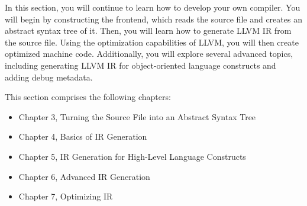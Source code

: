 In this section, you will continue to learn how to develop your own compiler. You will begin by constructing the frontend, which reads the source file and creates an abstract syntax tree of it. Then, you will learn how to generate LLVM IR from the source file. Using the optimization capabilities of LLVM, you will then create optimized machine code. Additionally, you will explore several advanced topics, including generating LLVM IR for object-oriented language constructs and adding debug metadata.

This section comprises the following chapters:

\begin{itemize}
\item
Chapter 3, Turning the Source File into an Abstract Syntax Tree

\item
Chapter 4, Basics of IR Generation

\item
Chapter 5, IR Generation for High-Level Language Constructs

\item
Chapter 6, Advanced IR Generation

\item
Chapter 7, Optimizing IR
\end{itemize}